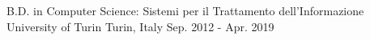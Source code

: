 


\begin{cventries}


\cventry
{B.D. in Computer Science: Sistemi per il Trattamento dell'Informazione} %
{University of Turin} %
{Turin, Italy} %
{Sep. 2012 - Apr. 2019} %
{ %
}


\end{cventries}